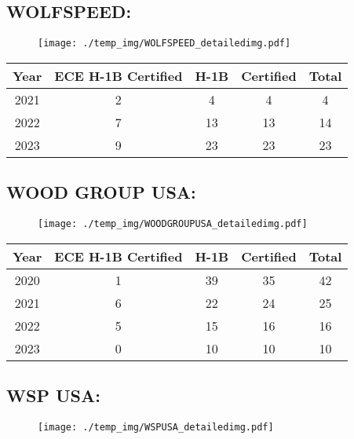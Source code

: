 \documentclass{article}%
\begin{document}
%
\newpage%
\subsection{WOLFSPEED:}%
\label{subsec:WOLFSPEED}%
\label{WOLFSPEEDdetailed}%


\begin{figure}[htbp]%
\centering%
\texttt{[image: ./temp\_img/WOLFSPEED\_detailedimg.pdf]}%
\end{figure}

%
\begin{longtable}{c|c|c|c|c}%
\hline%
Year&ECE H{-}1B Certified&H{-}1B&Certified&Total\\%
\hline%
2021&2&4&4&4\\%
\hline%
2022&7&13&13&14\\%
\hline%
2023&9&23&23&23\\%
\hline%
\end{longtable}

%
\newpage%
\subsection{WOOD GROUP USA:}%
\label{subsec:WOODGROUPUSA}%
\label{WOODGROUPUSAdetailed}%


\begin{figure}[htbp]%
\centering%
\texttt{[image: ./temp\_img/WOODGROUPUSA\_detailedimg.pdf]}%
\end{figure}

%
\begin{longtable}{c|c|c|c|c}%
\hline%
Year&ECE H{-}1B Certified&H{-}1B&Certified&Total\\%
\hline%
2020&1&39&35&42\\%
\hline%
2021&6&22&24&25\\%
\hline%
2022&5&15&16&16\\%
\hline%
2023&0&10&10&10\\%
\hline%
\end{longtable}

%
\newpage%
\subsection{WSP USA:}%
\label{subsec:WSPUSA}%
\label{WSPUSAdetailed}%


\begin{figure}[htbp]%
\centering%
\texttt{[image: ./temp\_img/WSPUSA\_detailedimg.pdf]}%
\end{figure}
\end{document}

